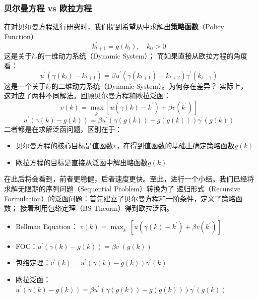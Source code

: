 \subsubsection{贝尔曼方程 vs 欧拉方程}
在对贝尔曼方程进行研究时，我们提到希望从中求解出\textbf{策略函数}（Policy Function）
\begin{equation*}
    k^{\prime}_{t+1}=g\left(k_t\right), \quad k_0>0
\end{equation*}
这是关于$k_t$的一维动力系统（Dynamic System）；
而如果直接从欧拉方程的角度看：
\begin{equation*}
    u^{\prime}\left(\gamma\left(k_t\right)-k_{t+1}\right) 
        = \beta u^{\prime}\left(\gamma\left(k_{t+1}\right)-k_{t+2}\right)
            \gamma^{\prime}\left(k_{t+1}\right)
\end{equation*}
这是一个关于$k_t$的二维动力系统（Dynamic System）。为何存在差异？
实际上，这对应了两种不同解法。回顾贝尔曼方程和欧拉泛函：
\begin{equation*}
    v\left(k\right)=\max_{k^{\prime}}
        \left[u\left(\gamma\left(k\right)-k^{\prime}\right)+\beta v\left(k^{\prime}\right)\right]
\end{equation*}
\begin{equation*}
    u^{\prime}\left(\gamma\left(k\right)-g\left(k\right)\right) 
        = \beta u^{\prime}\left(\gamma\left(g\left(k\right)\right)-g\left(g\left(k\right)\right)\right)
            \gamma^{\prime}\left(g\left(k\right)\right)
\end{equation*}
二者都是在求解泛函问题，区别在于：
\begin{itemize}
    \item 贝尔曼方程的核心目标是值函数$v$，在得到值函数的基础上确定策略函数$g\left(k\right)$
    \item 欧拉方程的目标是直接从泛函中解出略函数$g\left(k\right)$
\end{itemize}

在此后将会看到，前者更稳健，后者速度更快。至此，进行一个小结。我们已经将求解无限期的序列问题（Sequential Problem）转换为了
递归形式（Recursive Formulation）的泛函问题：首先建立了贝尔曼方程和一阶条件，定义了策略函数；
接着利用包络定理（BS-Theorm）得到欧拉泛函。
\begin{itemize}
    \item Bellman Equation：
    $v\left(k\right) = \max _{k^{\prime}}\left[u\left(\gamma\left(k\right)-k^{\prime}\right)+\beta v\left(k^{\prime}\right)\right]$
    \item FOC：$u^{\prime}\left(\gamma\left(k\right)-g\left(k\right)\right) = \beta v^{\prime}\left(g\left(k\right)\right)$
    \item 包络定理：$v^{\prime}\left(k\right) = 
        u^{\prime}\left(\gamma\left(k\right)-g\left(k\right)\right)\gamma^{\prime}\left(k\right)$
    \item 欧拉泛函：$u^{\prime}\left(\gamma\left(k\right)-g\left(k\right)\right) 
        = \beta u^{\prime}\left(\gamma\left(g\left(k\right)\right)-g\left(g\left(k\right)\right)\right)
            \gamma^{\prime}\left(g\left(k\right)\right)$
\end{itemize}

